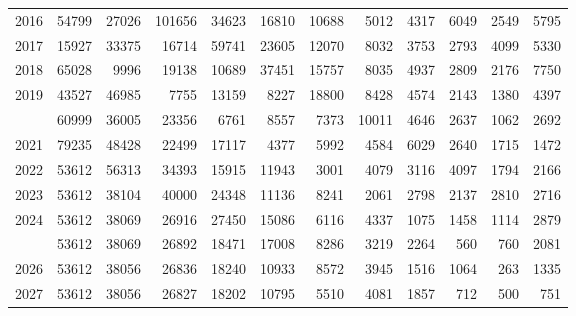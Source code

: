 \documentclass[
]{article}
\begin{document}
\begin{longtable}[t]{lrrrrrrrrrrr}
2016 & 54799 & 27026 & 101656 & 34623 & 16810 & 10688 & 5012 & 4317 & 6049 & 2549 & 5795\\
2017 & 15927 & 33375 & 16714 & 59741 & 23605 & 12070 & 8032 & 3753 & 2793 & 4099 & 5330\\
2018 & 65028 & 9996 & 19138 & 10689 & 37451 & 15757 & 8035 & 4937 & 2809 & 2176 & 7750\\
2019 & 43527 & 46985 & 7755 & 13159 & 8227 & 18800 & 8428 & 4574 & 2143 & 1380 & 4397\\
\addlinespace
2020 & 60999 & 36005 & 23356 & 6761 & 8557 & 7373 & 10011 & 4646 & 2637 & 1062 & 2692\\
2021 & 79235 & 48428 & 22499 & 17117 & 4377 & 5992 & 4584 & 6029 & 2640 & 1715 & 1472\\
2022 & 53612 & 56313 & 34393 & 15915 & 11943 & 3001 & 4079 & 3116 & 4097 & 1794 & 2166\\
2023 & 53612 & 38104 & 40000 & 24348 & 11136 & 8241 & 2061 & 2798 & 2137 & 2810 & 2716\\
2024 & 53612 & 38069 & 26916 & 27450 & 15086 & 6116 & 4337 & 1075 & 1458 & 1114 & 2879\\
\addlinespace
2025 & 53612 & 38069 & 26892 & 18471 & 17008 & 8286 & 3219 & 2264 & 560 & 760 & 2081\\
2026 & 53612 & 38056 & 26836 & 18240 & 10933 & 8572 & 3945 & 1516 & 1064 & 263 & 1335\\
2027 & 53612 & 38056 & 26827 & 18202 & 10795 & 5510 & 4081 & 1857 & 712 & 500 & 751\\*
\end{longtable}
\end{document}
